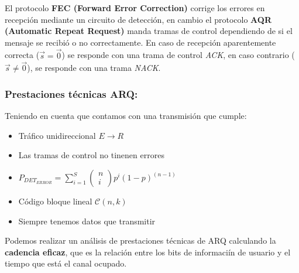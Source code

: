 \documentclass{article}
\begin{document}
\begin{center}
\end{center}

El protocolo \textbf{FEC (Forward Error Correction)} corrige los errores en recepción mediante un circuito de detección, en cambio el protocolo \textbf{AQR (Automatic Repeat Request)} manda tramas de control dependiendo de si el mensaje se recibió o no correctamente. En caso de recepción aparentemente correcta ($\vec{s}=\vec{0}$) se responde con una trama de control \textit{ACK}, en caso contrario ($\vec{s}\neq\vec{0}$), se responde con una trama \textit{NACK}.

\subsubsection{Prestaciones técnicas ARQ:}

Teniendo en cuenta que contamos con una transmisión que cumple:

\begin{itemize}
    \item Tráfico unidireccional $E\to R$
    \item Las tramas de control no tinenen errores
    \item $P_{DET_{ERROR}}=\sum_{i=1}^{S}\left(\begin{array}{c}n\\i\end{array}\right)p^i(1-p)^{(n-1)}$
    \item Código bloque lineal $\mathcal{C}(n,k)$
    \item Siempre tenemos datos que transmitir
\end{itemize}

Podemos realizar un análisis de prestaciones técnicas de ARQ calculando la \textbf{cadencia eficaz}, que es la relación entre los bits de informaciín de usuario y el tiempo que está el canal ocupado.
\end{document}
